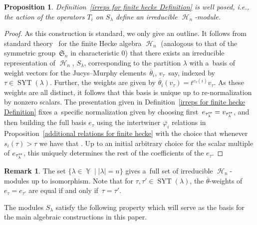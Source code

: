 \documentclass[10pt,a4paper]{amsart}
\numberwithin{equation}{section}
\newtheorem{Proposition}[Theorem]{Proposition}
\theoremstyle{definition}
\newtheorem{Remark}[Theorem]{Remark}
\DeclareMathOperator{\Par}{\mathbb{Y}}
\DeclareMathOperator{\SYT}{\mathrm{SYT}}
\DeclareMathOperator{\sH}{\mathscr{H}}
\begin{document}
\begin{Proposition}
 Definition~{\rm\ref{irreps for finite hecke Definition}} is well posed, i.e., the action of the operators $T_i$ on $S_{\lambda}$ define an irreducible $\sH_n$-module.
\end{Proposition}
\begin{proof}
 As this construction is standard, we only give an outline. It follows from standard theory~\cite[Theorem 3.9]{Murphy} for the finite Hecke algebra $\sH_n$ (analogous to that of the symmetric group~$\mathfrak{S}_n$ in characteristic $0$) that there exists an irreducible representation of $\sH_n$, $S_{\lambda}$, corresponding to the partition $\lambda$ with a~basis of weight vectors for the Jucys--Murphy elements~$\overline{\theta}_i$, $v_{\tau}$~say, indexed by $\tau \in \SYT(\lambda)$. Further, the weights are given by $\overline{\theta}_i(v_{\tau}) = t^{c_{\tau}(i)} v_{\tau}$. As these weights are all distinct, it follows that this basis is unique up to re-normalization by nonzero scalars.
 The presentation given in Definition~\ref{irreps for finite hecke Definition} fixes a~specific normalization given by choosing first~${e_{\tau^{\rm rs}_{\lambda}} = v_{\tau^{\rm rs}_{\lambda}}}$, and then building the full basis $e_{\tau}$ using the intertwiner $\overline{{\varphi_i}}$ relations in Proposition~\ref{additional relations for finite hecke} with the choice that whenever $s_i(\tau) > \tau$ we have that . Up to an initial arbitrary choice for the scalar multiple of $e_{\tau^{\rm rs}_{\lambda}}$, this uniquely determines the rest of the coefficients of the $e_{\tau}$.
\end{proof}

\begin{Remark}
 The set $\{ \lambda \in \Par \mid |\lambda| = n\}$ gives a~full set of irreducible $\sH_n$-modules up to isomorphism. Note that for $\tau,\tau' \in \SYT(\lambda)$, the $\overline{\theta}$-weights of $e_{\tau}= e_{\tau'}$ are equal if and only if~${\tau = \tau'}$.
\end{Remark}

The modules $S_{\lambda}$ satisfy the following property which will serve as the basis for the main algebraic constructions in this paper.
\end{document}
